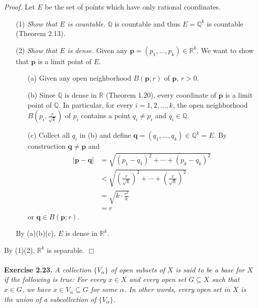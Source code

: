 \documentclass{article}
\begin{document}
\emph{Proof.}
Let $E$ be the set of points which have only rational coordinates.
\begin{enumerate}
\item[(1)]
\emph{Show that $E$ is countable.} $\mathbb{Q}$ is countable
and thus $E = \mathbb{Q}^k$ is countable (Theorem 2.13).
\item[(2)]
\emph{Show that $E$ is dense.}
Given any $\mathbf{p} = (p_1, \ldots, p_k) \in \mathbb{R}^k$.
We want to show that $\mathbf{p}$ is a limit point of $E$.
  \begin{enumerate}
  \item[(a)]
  Given any open neighborhood $B(\mathbf{p};r)$ of $\mathbf{p}$, $r > 0$.
  \item[(b)]
  Since $\mathbb{Q}$ is dense in $\mathbb{R}$ (Theorem 1.20),
  every coordinate of $\mathbf{p}$ is a limit point of $\mathbb{Q}$.
  In particular, for every $i = 1, 2, \ldots, k$,
  the open neighborhood $B\left(p_i, \frac{r}{\sqrt{k}}\right)$ of $p_i$
  contains a point $q_i \neq p_i$ and $q_i \in \mathbb{Q}$.
  \item[(c)]
  Collect all $q_i$ in (b)
  and define $\mathbf{q} = (q_1, \ldots, q_k) \in \mathbb{Q}^k = E$.
  By construction $\mathbf{q} \neq \mathbf{p}$ and
  \begin{align*}
    |\mathbf{p} - \mathbf{q}|
    &= \sqrt{(p_1 - q_1)^2 + \cdots + (p_k - q_k)^2} \\
    &< \sqrt{\left(\frac{r}{\sqrt{k}}\right)^2 + \cdots
      + \left(\frac{r}{\sqrt{k}}\right)^2} \\
    &= \sqrt{k \cdot \frac{r^2}{k}} \\
    &= r
  \end{align*}
  or $\mathbf{q} \in B(\mathbf{p};r)$.
  \end{enumerate}
  By (a)(b)(c), $E$ is dense in $\mathbb{R}^k$.
\end{enumerate}
By (1)(2), $\mathbb{R}^k$ is separable.
$\Box$ \\\\






\textbf{Exercise 2.23.}
\emph{A collection $\{V_\alpha\}$ of open subsets of $X$ is
said to be a base for $X$ if the following is true:
For every $x \in X$ and every open set $G \subseteq X$ such that $x \in G$,
we have $x \in V_\alpha \subseteq G$ for some $\alpha$.
In other words, every open set in $X$ is the union of a subcollection of $\{V_\alpha\}$.} \\
\end{document}
